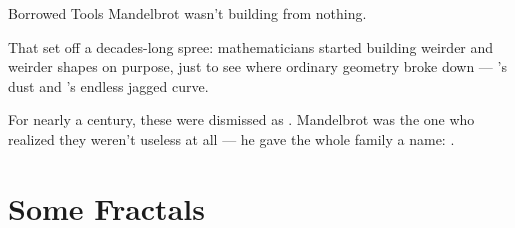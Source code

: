 \begin{frame}{Borrowed Tools}
  \small
  Mandelbrot wasn't building from nothing.

  \pause
  \vspace{0.2cm}
  \begin{center}
  \end{center}

  \pause
  \vspace{0.2cm}
  That set off a decades-long spree: mathematicians started building
  weirder and weirder shapes on purpose, just to see where ordinary
  geometry broke down --- 's dust and
  's endless jagged curve.

  \pause
  \vspace{0.2cm}
  For nearly a century, these were dismissed as
  . Mandelbrot was the one who
  realized they weren't useless at all --- he gave the whole family
  a name: .

  \pause
  \vspace{0.3cm}
  \begin{center}
  \end{center}
\end{frame}

\section{Some Fractals}

